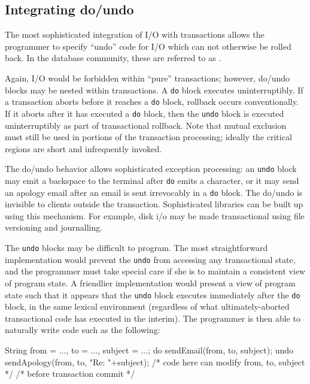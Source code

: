 \subsection{Integrating do/undo}
The most sophisticated integration of I/O with transactions allows the
programmer to specify ``undo'' code for I/O which can not otherwise be
rolled back.  In the database community, these are referred to as
.

Again, I/O would be forbidden within ``pure'' transactions; however,
do/undo blocks may be nested within transactions.  A \texttt{do} block
executes uninterruptibly.  If a transaction aborts before it reaches a
\texttt{do} block, rollback occurs conventionally.  If it aborts after it
has executed a \texttt{do} block, then the \texttt{undo} block is
executed uninterruptibly as part of transactional rollback.  Note that
mutual exclusion must still be used in portions of the transaction
processing; ideally the critical regions are short and infrequently
invoked.

The do/undo behavior allows sophisticated exception processing: an
\texttt{undo} block may emit a backspace to the terminal after
\texttt{do} emits a character, or it may send an apology email after
an email is sent irrevocably in a \texttt{do} block.  The do/undo is
invisible to clients outside the transaction.  Sophisticated
libraries can be built up using this mechanism.  For example, disk i/o
may be made transactional using file versioning and journalling.

The \texttt{undo} blocks may be difficult to program.  The most
straightforward implementation would prevent the \texttt{undo} from
accessing any transactional state, and the programmer must take
special care if she is to maintain a consistent view of program state.
A friendlier implementation would present a view of program state such
that it appears that the \texttt{undo} block executes immediately
after the \texttt{do} block, in the same lexical environment
(regardless of what ultimately-aborted transactional code has executed
in the interim).  The programmer is then able to naturally write code
such as the following:
\begin{inlinecode}
String from = ..., to = ..., subject = ...;
do {
  sendEmail(from, to, subject);
} undo {
  sendApology(from, to, "Re: "+subject);
}
/* code here can modify from, to, subject */
/* before transaction commit */
\end{inlinecode}

